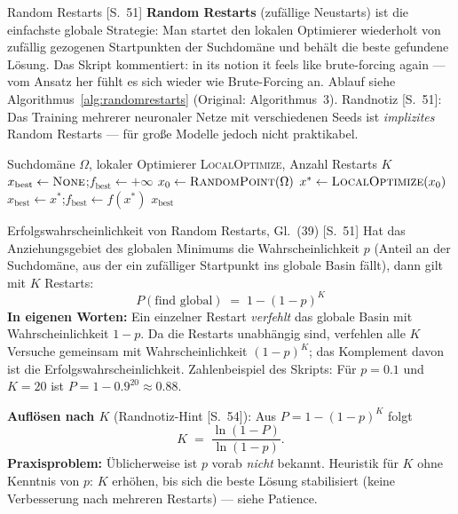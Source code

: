 \begin{defbox}{Random Restarts [S.~51]}
\textbf{Random Restarts} (zufällige Neustarts) ist die einfachste globale Strategie:
Man startet den lokalen Optimierer wiederholt von zufällig gezogenen Startpunkten der
Suchdomäne und behält die beste gefundene Lösung. Das Skript kommentiert:
\glqq in its notion it feels like brute-forcing again\grqq{} --- vom Ansatz her fühlt es
sich wieder wie Brute-Forcing an. Ablauf siehe Algorithmus~\ref{alg:randomrestarts}
(Original: Algorithmus~3). Randnotiz [S.~51]: Das Training mehrerer neuronaler Netze
mit verschiedenen Seeds ist \emph{implizites} Random Restarts --- für gro{\ss}e Modelle
jedoch nicht praktikabel.
\end{defbox}

\begin{algorithm}[H]
\caption{Random Restarts (Original: Algorithmus~3 [S.~51])}
\label{alg:randomrestarts}
\begin{algorithmic}[1]
\Require Suchdomäne $\Omega$, lokaler Optimierer \textsc{LocalOptimize}, Anzahl Restarts $K$
\State $x_{\text{best}} \gets \textsc{None}$;\quad $f_{\text{best}} \gets +\infty$
  \State $x_0 \gets \textsc{RandomPoint}(\Omega)$
  \State $x^{*} \gets \textsc{LocalOptimize}(x_0)$
    \State $x_{\text{best}} \gets x^{*}$;\quad $f_{\text{best}} \gets f(x^{*})$
  \EndIf
\EndFor
\State \Return $x_{\text{best}}$
\end{algorithmic}
\end{algorithm}

\begin{satzbox}{Erfolgswahrscheinlichkeit von Random Restarts, Gl.~(39) [S.~51]}
Hat das Anziehungsgebiet des globalen Minimums die Wahrscheinlichkeit $p$ (Anteil an
der Suchdomäne, aus der ein zufälliger Startpunkt ins globale Basin fällt), dann gilt
mit $K$ Restarts:
\[
  P(\text{find global}) \;=\; 1 - (1 - p)^{K} \tag{39}
\]
\textbf{In eigenen Worten:} Ein einzelner Restart \emph{verfehlt} das globale Basin mit
Wahrscheinlichkeit $1-p$. Da die Restarts unabhängig sind, verfehlen alle $K$ Versuche
gemeinsam mit Wahrscheinlichkeit $(1-p)^K$; das Komplement davon ist die
Erfolgswahrscheinlichkeit. Zahlenbeispiel des Skripts: Für $p = 0.1$ und $K = 20$ ist
$P = 1 - 0.9^{20} \approx 0.88$.

\medskip
\textbf{Auflösen nach $K$} (Randnotiz-Hint [S.~54]): Aus $P = 1-(1-p)^K$ folgt
\[
  K \;=\; \frac{\ln(1-P)}{\ln(1-p)}.
\]
\textbf{Praxisproblem:} Üblicherweise ist $p$ vorab \emph{nicht} bekannt. Heuristik für
$K$ ohne Kenntnis von $p$: $K$ erhöhen, bis sich die beste Lösung stabilisiert (keine
Verbesserung nach mehreren Restarts) --- siehe Patience.
\end{satzbox}


